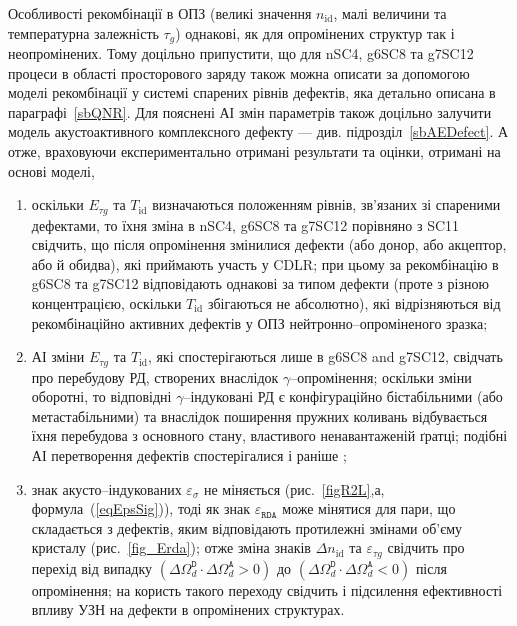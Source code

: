 Особливості рекомбінації в ОПЗ (великі значення $n_\mathrm{id}$, малі величини та температурна залежність $\tau_g$)
однакові, як  для опромінених структур так і неопромінених.
Тому доцільно припустити, що для nSC4, g6SC8 та g7SC12 процеси в області просторового заряду також можна описати
за допомогою моделі рекомбінації у системі спарених рівнів дефектів, яка детально описана в параграфі~\ref{sbQNR}.
Для пояснені АІ змін параметрів також доцільно залучити модель акустоактивного комплексного дефекту --- див. підрозділ~\ref{sbAEDefect}.
А отже, враховуючи експериментально отримані результати та оцінки, отримані на основі моделі,
\begin{enumerate}[label=\asbuk*),leftmargin=0em,itemindent=1.5em]
\item оскільки $E_{\tau g}$ та $T_{\mathrm{id}}$  визначаються положенням рівнів, зв'язаних
зі спареними дефектами, то їхня зміна в nSC4, g6SC8 та g7SC12 порівняно з SC11 свідчить, що
після опромінення змінилися дефекти (або донор, або акцептор, або й обидва), які приймають участь у CDLR;
при цьому за рекомбінацію в g6SC8 та g7SC12 відповідають однакові за типом дефекти (проте з різною концентрацією,
 оскільки $T_{\mathrm{id}}$ збігаються не абсолютно), які відрізняються від рекомбінаційно активних дефектів у ОПЗ нейтронно--опроміненого зразка;

\item  АІ зміни   $E_{\tau g}$ та $T_{\mathrm{id}}$, які спостерігаються лише в g6SC8 and g7SC12,
 свідчать про перебудову РД, створених внаслідок $\gamma$--опромінення;
 оскільки зміни оборотні, то  відповідні
 $\gamma$--індуковані РД є конфігураційно бістабільними (або метастабільними) та внаслідок поширення пружних коливань відбувається їхня перебудова з основного стану,
 властивого ненавантаженій ґратці;
 подібні АІ перетворення дефектів спостерігалися і раніше \cite{Wosinski,Ostapenko1994,YOlikhTPL2011r};

 \item знак акусто--індукованих $\varepsilon_{\sigma}$ не міняється (рис.~\ref{figR2L},а, формула~(\ref{eqEpsSig})), тоді як
  знак  $\varepsilon_{\mathtt{RDA}}$  може мінятися для пари, що складається з дефектів, яким відповідають протилежні
  змінами об'єму кристалу (рис.~\ref{fig_Erda});
  отже зміна знаків $\Delta n_{\mathrm{id}}$ та $\varepsilon_{\tau g}$ свідчить про перехід від випадку
  $(\Delta\Omega_d^\mathtt{D}\cdot\Delta\Omega_d^\mathtt{A}>0)$ до
  $(\Delta\Omega_d^\mathtt{D}\cdot\Delta\Omega_d^\mathtt{A}<0)$ після опромінення;
  на користь такого переходу свідчить і підсилення ефективності впливу УЗН на дефекти в опромінених структурах.
\end{enumerate}

